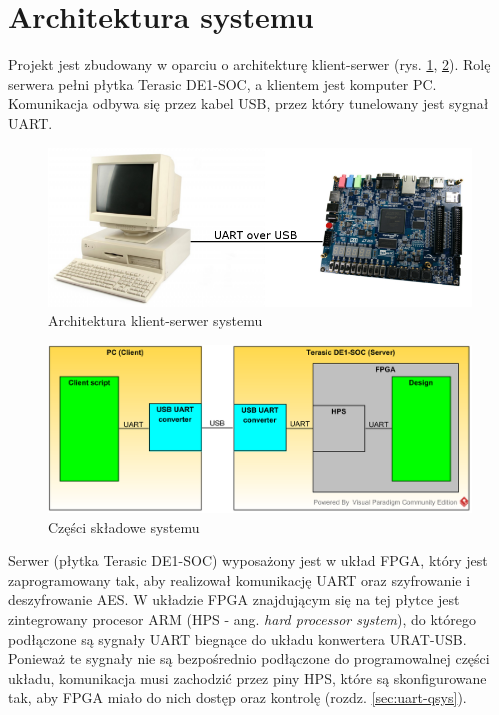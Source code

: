 \section{Architektura systemu}
\label{sec:architektura-systemu}
Projekt jest zbudowany w oparciu o architekturę klient-serwer (rys. \ref{fig:system-architecture-basic}, \ref{fig:system-architecture}). Rolę serwera pełni płytka Terasic DE1-SOC, a klientem jest komputer PC. Komunikacja odbywa się przez kabel USB, przez który tunelowany jest sygnał UART.

\begin{figure}[!h]
\label{fig:system-architecture-basic}
\centering
\includegraphics[width=6in]{system-architecture-basic.png}
\caption{Architektura klient-serwer systemu}
\end{figure}

\begin{figure}[!h]
\label{fig:system-architecture}
\centering
\includegraphics{system-architecture.png}
\caption{Części składowe systemu}
\end{figure}

Serwer (płytka Terasic DE1-SOC) wyposażony jest w układ FPGA, który jest zaprogramowany tak, aby realizował komunikację UART oraz szyfrowanie i deszyfrowanie AES. W układzie FPGA znajdującym się na tej płytce jest zintegrowany procesor ARM (HPS - ang. \textit{hard processor system}), do którego podłączone są sygnały UART biegnące do układu konwertera URAT-USB. Ponieważ te sygnały nie są bezpośrednio podłączone do programowalnej części układu, komunikacja musi zachodzić przez piny HPS, które są skonfigurowane tak, aby FPGA miało do nich dostęp oraz kontrolę (rozdz. \ref{sec:uart-qsys}).

